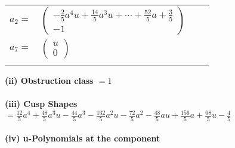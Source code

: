 \documentclass[1p]{elsarticle_modified}
\theoremstyle{definition}
\begin{document}
\begin{tabular}{m{7pt} m{180pt} m{7pt} m{180pt} }
\flushright $a_{2}=$&$\begin{pmatrix}-\frac{2}{5} a^4 u+\frac{14}{5} a^3 u+\cdots+\frac{52}{5} a+\frac{3}{5}\\-1\end{pmatrix}$ \\
\flushright $a_{7}=$&$\begin{pmatrix}u\\0\end{pmatrix}$\\&\end{tabular}
\flushleft \textbf{(ii) Obstruction class $= 1$}\\~\\
\flushleft \textbf{(iii) Cusp Shapes $= \frac{12}{5} a^4+\frac{48}{5} a^3 u-\frac{44}{5} a^3-\frac{132}{5} a^2 u-\frac{72}{5} a^2-\frac{48}{5} a u+\frac{156}{5} a+\frac{68}{5} u-\frac{4}{5}$}\\~\\
\newpage\renewcommand{\arraystretch}{1}
\flushleft \textbf{(iv) u-Polynomials at the component}\newline \\
\end{document}
